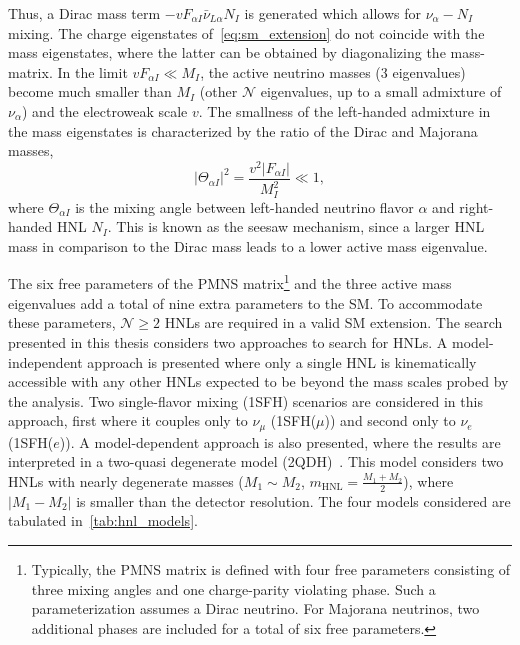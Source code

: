 Thus, a Dirac mass term $-vF_{\alpha I}\bar{\nu}_{L\alpha}N_I$ is generated which allows for $\nu_\alpha - N_I$ mixing. The charge eigenstates of~\cref{eq:sm_extension} do not coincide with the mass eigenstates, where the latter can be obtained by diagonalizing the mass-matrix. In the limit $vF_{\alpha I} \ll M_I$, the active neutrino masses (3 eigenvalues) become much smaller than $M_I$ (other $\mathcal{N}$ eigenvalues, up to a small admixture of $\nu_\alpha$) and the electroweak scale $v$. The smallness of the left-handed admixture in the mass eigenstates is characterized by the ratio of the Dirac and Majorana masses,
\begin{equation}\label{eq:mixing}
    |\Theta_{\alpha I}|^2=\frac{v^2|F_{\alpha I}|}{M_I^2} \ll 1,
\end{equation}
where $\Theta_{\alpha I}$ is the mixing angle between left-handed neutrino flavor $\alpha$ and right-handed HNL $N_I$. This is known as the seesaw mechanism, since a larger HNL mass in comparison to the Dirac mass leads to a lower active mass eigenvalue.

The six free parameters of the PMNS matrix\footnote{Typically, the PMNS matrix is defined with four free parameters consisting of three mixing angles and one charge-parity violating phase. Such a parameterization assumes a Dirac neutrino. For Majorana neutrinos, two additional phases are included for a total of six free parameters.} and the three active mass eigenvalues add a total of nine extra parameters to the SM. To accommodate these parameters, $\mathcal{N}\geq 2$ HNLs are required in a valid SM extension. The search presented in this thesis considers two approaches to search for HNLs. A model-independent approach is presented where only a single HNL is kinematically accessible with any other HNLs expected to be beyond the mass scales probed by the analysis. Two single-flavor mixing (1SFH) scenarios are considered in this approach, first where it couples only to $\nu_\mu$ (1SFH($\mu$)) and second only to $\nu_e$ (1SFH($e$)). A model-dependent approach is also presented, where the results are interpreted in a two-quasi degenerate model (2QDH)~\cite{Tastet2021}. This model considers two HNLs with nearly degenerate masses ($M_1\sim M_2$, $m_\mathrm{HNL}=\frac{M_1+M_2}{2}$), where $|M_1-M_2|$ is smaller than the detector resolution. The four models considered are tabulated in~\cref{tab:hnl_models}.

